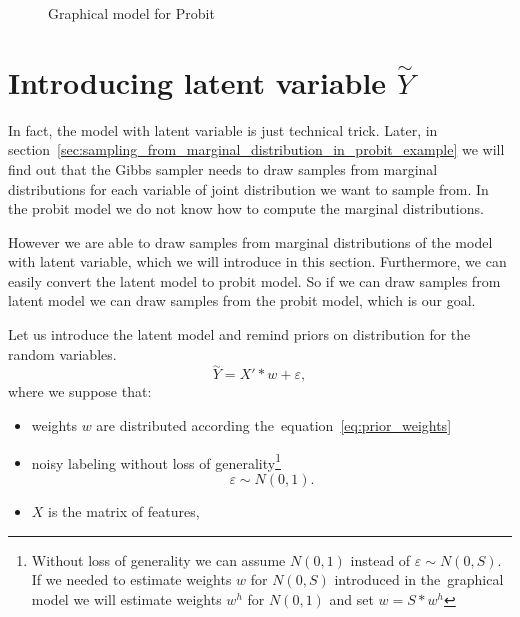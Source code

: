 \begin{figure}[!hb]
\centering

\caption{Graphical model for Probit}
\label{fig:probitGM}
\end{figure}

\section{Introducing latent variable $\overset{\sim}{Y}$ }
\label{sec:introducing_latent_variale}
In fact, the model with latent variable is just technical trick. Later, in section~\ref{sec:sampling_from_marginal_distribution_in_probit_example} we will find out that the Gibbs sampler needs to draw samples from marginal distributions for each variable of joint distribution we want to sample from. In the probit model we do not know how to compute the marginal distributions.

However we are able to draw samples from marginal distributions of the model with latent variable, which we will introduce in this section. Furthermore, we can easily convert the latent model to probit model. So if we can draw samples from latent model we can draw samples from the probit model, which is our goal.

Let us introduce the latent model and remind priors on distribution for the random variables.
\begin{equation}\label{eq:lat}
    \overset{\sim}{Y} = X' * w + \varepsilon, 
\end{equation}
where we suppose that:
\begin{itemize}
    \item weights $w$ are distributed according the~equation~\ref{eq:prior_weights} 
    \item noisy labeling without loss of generality\footnote{Without loss of generality we can assume $N(0,1)$ instead of $\varepsilon \sim N(0, S)$. 
        If we needed to estimate weights $w$ for $N(0, S)$ introduced in the~graphical model we will estimate weights $w^h$ for $N(0,1)$ and set $w = S*w^h$}
        \begin{equation}\label{eq:noise}
        \varepsilon \sim N(0, 1).
        \end{equation}
    \item $X$ is the matrix of features, \\
\end{itemize}

